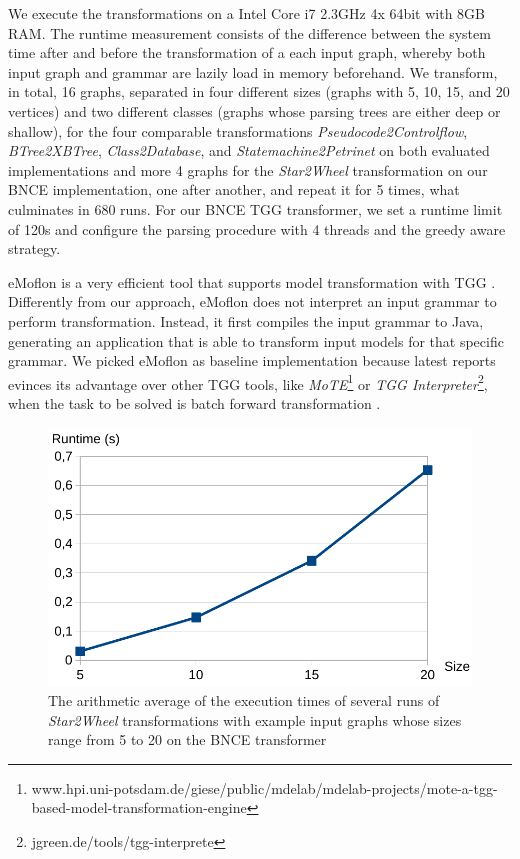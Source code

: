 We execute the transformations on a Intel Core i7 2.3GHz 4x 64bit with 8GB RAM. The runtime measurement consists of the difference between the system time after and before the transformation of a each input graph, whereby both input graph and grammar are lazily load in memory beforehand. We transform, in total, 16 graphs, separated in four different sizes (graphs with 5, 10, 15, and 20 vertices) and two different classes (graphs whose parsing trees are either deep or shallow), for the four comparable transformations \emph{Pseudocode2Controlflow}, \emph{BTree2XBTree}, \emph{Class2Database}, and \emph{Statemachine2Petrinet} on both evaluated implementations and more 4 graphs for the \emph{Star2Wheel} transformation on our BNCE implementation, one after another, and repeat it for 5 times, what culminates in 680 runs. For our BNCE TGG transformer, we set a runtime limit of 120s and configure the parsing procedure with 4 threads and the greedy aware strategy.

eMoflon is a very efficient tool that supports model transformation with TGG \cite{leblebici2014developing}. Differently from our approach, eMoflon does not interpret an input grammar to perform transformation. Instead, it first compiles the input grammar to Java, generating an application that is able to transform input models for that specific grammar. We picked eMoflon as baseline implementation because latest reports evinces its advantage over other TGG tools, like \emph{MoTE}\footnote{www.hpi.uni-potsdam.de/giese/public/mdelab/mdelab-projects/mote-a-tgg-based-model-transformation-engine} or \emph{TGG Interpreter}\footnote{jgreen.de/tools/tgg-interprete}, when the task to be solved is batch forward transformation \cite{hildebrandt2013survey, leblebici2014comparison}.

\begin{figure}
	\centering
	\includegraphics[width=.45\textwidth]{figures/performance/star2wheel}
	\caption{The arithmetic average of the execution times of several runs of \emph{Star2Wheel} transformations with example input graphs whose sizes range from 5 to 20 on the BNCE transformer}
	\label{fig:performance-star2wheel}
\end{figure}

